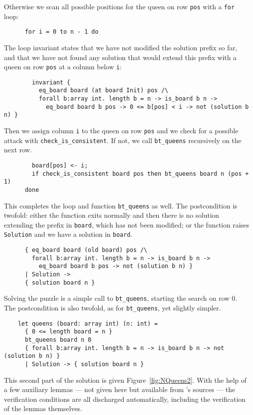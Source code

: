 Otherwise we scan all possible positions for the queen on row
\texttt{pos} with a \texttt{for} loop:
\begin{verbatim}
      for i = 0 to n - 1 do
\end{verbatim}
The loop invariant states that we have not modified the solution
prefix so far, and that we have not found any solution that would
extend this prefix with a queen on row \texttt{pos} at a column below
\texttt{i}:
\begin{verbatim}
        invariant {
          eq_board board (at board Init) pos /\
          forall b:array int. length b = n -> is_board b n ->
            eq_board board b pos -> 0 <= b[pos] < i -> not (solution b n) }
\end{verbatim}
Then we assign column \texttt{i} to the queen on row \texttt{pos} and
we check for a possible attack with \verb|check_is_consistent|. If
not, we call \verb|bt_queens| recursively on the next row.
\begin{verbatim}
        board[pos] <- i;
        if check_is_consistent board pos then bt_queens board n (pos + 1)
      done
\end{verbatim}
This completes the loop and function \verb|bt_queens| as well.
The postcondition is twofold: either the function exits normally and
then there is no solution extending the prefix in \texttt{board},
which has not been modified;
or the function raises \texttt{Solution} and we have a solution in
\texttt{board}.
\begin{verbatim}
      { eq_board board (old board) pos /\
        forall b:array int. length b = n -> is_board b n ->
          eq_board board b pos -> not (solution b n) }
      | Solution ->
      { solution board n }
\end{verbatim}
Solving the puzzle is a simple call to \verb|bt_queens|, starting the
search on row 0. The postcondition is also twofold, as for
\verb|bt_queens|, yet slightly simpler.
\begin{verbatim}
    let queens (board: array int) (n: int) =
      { 0 <= length board = n }
      bt_queens board n 0
      { forall b:array int. length b = n -> is_board b n -> not (solution b n) }
      | Solution -> { solution board n }
\end{verbatim}
This second part of the solution is given Figure~\ref{fig:NQueens2}.
With the help of a few auxiliary lemmas --- not given here but available
from \why's sources --- the verification conditions are all discharged
automatically, including the verification of the lemmas themselves.
